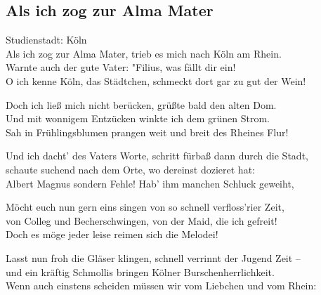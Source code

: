 
\subsection*{Als ich zog zur Alma Mater}
%
%
\nopagebreak
\hfill%
Studienstadt: Köln\\
\nopagebreak
\thestrophe Als ich zog zur Alma Mater, trieb es mich nach Köln am Rhein. \\
Warnte auch der gute Vater: "Filius, was fällt dir ein! \\
O ich kenne Köln, das Städtchen, schmeckt dort gar zu gut der Wein! \\

\thestrophe Doch ich ließ mich nicht berücken, grüßte bald den alten Dom. \\
Und mit wonnigem Entzücken winkte ich dem grünen Strom. \\
Sah in Frühlingsblumen prangen weit und breit des Rheines Flur! \\

\thestrophe Und ich dacht' des Vaters Worte, schritt fürbaß dann durch die Stadt, \\
schaute suchend nach dem Orte, wo dereinst dozieret hat: \\
Albert Magnus sondern Fehle! Hab' ihm manchen Schluck geweiht, \\

\thestrophe Möcht euch nun gern eins singen von so schnell verfloss'rier Zeit, \\
von Colleg und Becherschwingen, von der Maid, die ich gefreit! \\
Doch es möge jeder leise reimen sich die Melodei! \\

\thestrophe Lasst nun froh die Gläser klingen, schnell verrinnt der Jugend Zeit – \\
und ein kräftig Schmollis bringen Kölner Burschenherrlichkeit.\\
Wenn auch einstens scheiden müssen wir vom Liebchen und vom Rhein: \\
